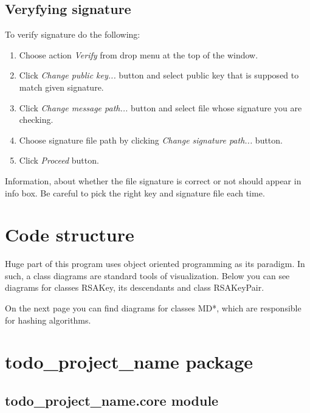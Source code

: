 \documentclass[letterpaper,10pt,english]{sphinxmanual}
\begin{document}
\section{Veryfying signature}
To verify signature do the following:
\begin{enumerate}
    \item Choose action {\em Verify} from drop menu at the top of the window.
    \item Click {\em Change public key...} button and select public key that is supposed
        to match given signature.
    \item Click {\em Change message path...} button and select file whose signature you are checking.
    \item Choose signature file path by clicking {\em Change signature path...} button.
    \item Click {\em Proceed} button.
\end{enumerate}
Information, about whether the file signature is correct or not should appear in
info box. Be careful to pick the right key and signature file each time.

\chapter{Code structure}

\vspace{1em}
Huge part of this program uses object oriented programming
as its paradigm. In such, a class diagrams are standard tools
of visualization. Below you can see diagrams for classes
RSAKey, its descendants and class RSAKeyPair.

On the next page you can find diagrams for classes MD*, which
are responsible for hashing algorithms.
\vspace{3em}





\chapter{todo\_project\_name package}
\label{\detokenize{modules:todo-project-name}}\label{\detokenize{modules::doc}}
\sphinxstepscope


\section{todo\_project\_name.core module}
\label{\detokenize{todo_project_name:module-todo_project_name.core}}\label{\detokenize{todo_project_name:todo-project-name-core-module}}
\end{document}
